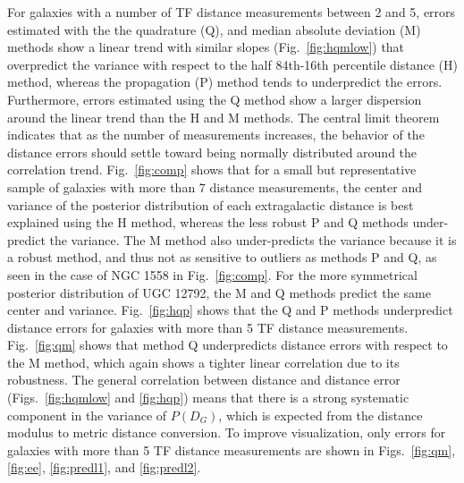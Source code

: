 \documentclass[a4paper,fleqn,usenatbib]{mnras}
\begin{document}
For galaxies with a number of TF distance measurements between 2 and 5, errors estimated with the the quadrature (Q), and median absolute deviation (M) methods show a linear trend with similar slopes (Fig.~\ref{fig:hqmlow}) that overpredict the variance with respect to the half 84th-16th percentile distance (H) method, whereas the propagation (P) method tends to underpredict the errors. Furthermore, errors estimated using the Q method show a larger dispersion around the linear trend than the H and M methods. The central limit theorem indicates that as the number of measurements increases, the behavior of the distance errors should settle toward being normally distributed around the correlation trend. Fig.~\ref{fig:comp} shows that for a small but representative sample of galaxies with more than 7 distance measurements, the center and variance of the posterior distribution of each extragalactic distance is best explained using the H method, whereas the less robust P and Q methods under-predict the variance. The M method also under-predicts the variance because it is a robust method, and thus not as sensitive to outliers as methods P and Q, as seen in the case of NGC 1558 in Fig.~\ref{fig:comp}. For the more symmetrical posterior distribution of UGC 12792, the M and Q methods predict the same center and variance. Fig.~\ref{fig:hqp} shows that the Q and P methods underpredict distance errors for galaxies with more than 5 TF distance measurements. Fig.~\ref{fig:qm} shows that method Q underpredicts distance errors with respect to the M method, which again shows a tighter linear correlation due to its robustness. The general correlation between distance and distance error (Figs.~\ref{fig:hqmlow} and \ref{fig:hqp}) means that there is a strong systematic component in the variance of $P(D_G)$, which is expected from the distance modulus to metric distance conversion. To improve visualization, only errors for galaxies with more than 5 TF distance measurements are shown in Figs.~\ref{fig:qm}, \ref{fig:ee}, \ref{fig:predl1}, and \ref{fig:predl2}.
\end{document}
